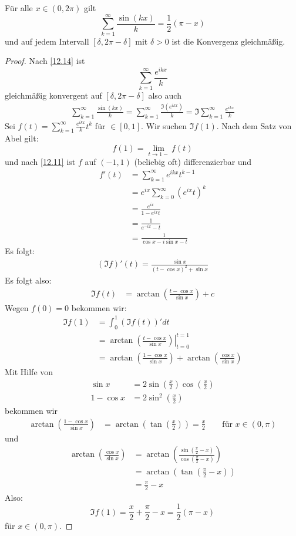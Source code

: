 \documentclass[a4paper,10pt]{scrbook}
\begin{document}
\begin{st}
\label{12.15}
Für alle $x\in(0,2\pi)$ gilt
\[
\sum_{k=1}^\infty \frac{\sin(kx)}k = \frac 12 (\pi-x)
\]
und auf jedem Intervall $[\delta,2\pi-\delta]$ mit $\delta>0$ ist die Konvergenz gleichmäßig.

\begin{proof}
Nach \ref{12.14} ist
\[
\sum_{k=1}^\infty \frac {e^{ikx}}k
\]
gleichmäßig konvergent auf $[\delta, 2\pi-\delta]$ also auch
\begin{align*}
\sum_{k=1}^\infty \frac{\sin(kx)}k
= \sum_{k=1}^\infty \frac {\Im(e^{ikx})}k
=\Im \sum_{k=1}^\infty \frac{e^{ikx}}k
\end{align*}
Sei $f(t) = \sum_{k=1}^\infty \frac{e^{ikx}}k t^k$ für $\in[0,1]$.
Wir suchen $\Im f(1)$.
Nach dem Satz von Abel gilt:
\[
f(1)=\lim_{t\to 1-}f(t)
\]
und nach \ref{12.11} ist $f$ auf $(-1,1)$ (beliebig oft) differenzierbar und
\begin{align*}
f'(t) 
&= \sum_{k=1}^\infty e^{ikx}t^{k-1}\\
&= e^{ix}\sum_{k=0}^\infty (e^{ix}t)^k\\
&= \frac {e^{ix}}{1-e^{ix}t}\\
&= \frac 1{e^{-ix}-t}\\
&= \frac 1{\cos x -i\sin x -t}
\end{align*}
Es folgt:
\begin{align*}
(\Im f)'(t)=\frac {\sin x}{(t-\cos x)^2 +\sin x}
\end{align*}
Es folgt also:
\begin{align*}
\Im f(t)
&= \arctan \left(\frac {t-\cos x}{\sin x}\right) + c
\end{align*}
Wegen $f(0)=0$ bekommen wir:
\begin{align*}
\Im f(1)
&= \int_0^1(\Im f(t))'dt\\
&= \left.\arctan\left( \frac {t-\cos x}{\sin x}\right)\right|_{t=0}^{t=1}\\
&= \arctan \left(\frac {1-\cos x}{\sin x}\right) +\arctan\left(\frac {\cos x}{\sin x}\right)
\end{align*}
Mit Hilfe von
\begin{align*}
\sin x &= 2\sin\left(\frac x2\right)\cos\left(\frac x2\right)\\
1-\cos x &= 2\sin^2\left(\frac x2\right)
\end{align*}
bekommen wir
\begin{align*}
\arctan\left(\frac {1-\cos x}{\sin x}\right)
&= \arctan\left(\tan\left(\frac x2\right)\right)
= \frac x2 \qquad \text{für } x\in (0,\pi)
\end{align*}
und
\begin{align*}
\arctan\left(\frac{\cos x}{\sin x}\right)
&= \arctan\left(\frac{\sin(\frac \pi2-x)}{\cos(\frac \pi2-x)}\right) \\
&= \arctan\left(\tan\left(\frac \pi 2-x\right)\right)\\
&= \frac \pi 2 -x
\end{align*}
Also:
\[
\Im f(1) = \frac x2 +\frac \pi 2- x= \frac 12 (\pi -x)
\]
für $x\in (0,\pi)$.
\end{proof}
\end{st}
\end{document}
